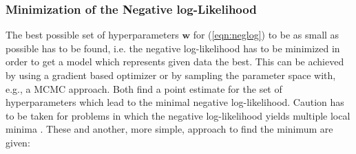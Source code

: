 \documentclass[%
  a4paper,oneside,%
  11pt,%
  smallchapters,
  style=printdev,
  extramargin,
  green,%
  rgb, <cmyk>
  ]{tubsbook}
\begin{document}
\subsubsection{Minimization of the Negative log-Likelihood}
The best possible set of hyperparameters $\bm{w}$ for (\ref{eqn:neglog}) to be as small as possible has to be found, i.e. the negative log-likelihood has to be minimized in order to get a model which represents given data the best. This can be achieved by using a gradient based optimizer or by sampling the parameter space with, e.g., a MCMC approach. Both find a point estimate for the set of hyperparameters which lead to the minimal negative log-likelihood. Caution has to be taken for problems in which the negative log-likelihood yields multiple local minima \cite{Svensson2015}.  These and another, more simple, approach to find the minimum are given:
\end{document}
